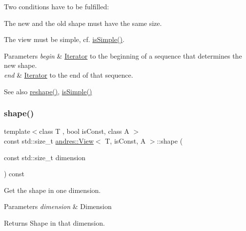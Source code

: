 Two conditions have to be fulfilled\+:
\begin{DoxyItemize}
\item The new and the old shape must have the same size.
\item The view must be simple, cf. \hyperlink{classandres_1_1View_a3f6bf9dc15389945a30f01a000c1d2a5}{is\+Simple()}.
\end{DoxyItemize}
\begin{DoxyParams}{Parameters}
{\em begin} & \hyperlink{classandres_1_1Iterator}{Iterator} to the beginning of a sequence that determines the new shape. \\
\hline
{\em end} & \hyperlink{classandres_1_1Iterator}{Iterator} to the end of that sequence.\\
\hline
\end{DoxyParams}
\begin{DoxySeeAlso}{See also}
\hyperlink{classandres_1_1View_a7d0432d097b8ce03a413006ec2fe9469}{reshape()}, \hyperlink{classandres_1_1View_a3f6bf9dc15389945a30f01a000c1d2a5}{is\+Simple()} 
\end{DoxySeeAlso}
\mbox{\label{classandres_1_1View_a981d648b453590bed7026754b09dbaba}} 
\subsubsection{\texorpdfstring{shape()}{shape()}}
{\footnotesize\ttfamily template$<$class T , bool is\+Const, class A $>$ \\
const std\+::size\+\_\+t \hyperlink{classandres_1_1View}{andres\+::\+View}$<$ T, is\+Const, A $>$\+::shape (\begin{DoxyParamCaption}\item[{const std\+::size\+\_\+t}]{dimension }\end{DoxyParamCaption}) const\hspace{0.3cm}{\ttfamily [inline]}}

Get the shape in one dimension.


\begin{DoxyParams}{Parameters}
{\em dimension} & Dimension \\
\hline
\end{DoxyParams}
\begin{DoxyReturn}{Returns}
Shape in that dimension. 
\end{DoxyReturn}
\mbox{\label{classandres_1_1View_a72b399659898eaa801789190ff6ea6a8}} 
